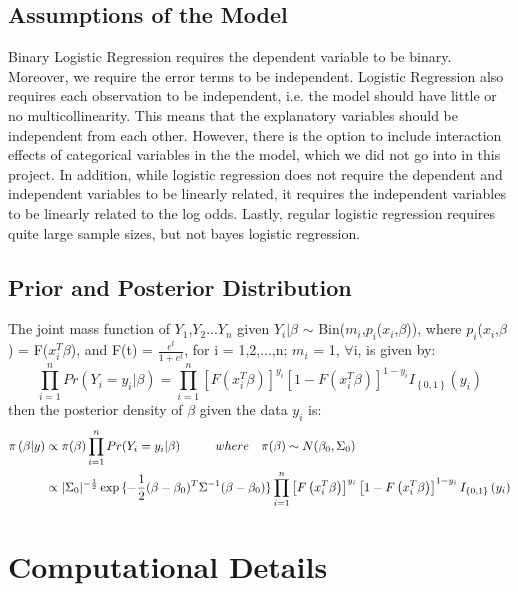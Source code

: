 \documentclass[paper=letterpaper,fontsize=12pt,twoside,american]{scrartcl}
\begin{document}
\subsection{Assumptions of the Model}
Binary Logistic Regression requires the dependent variable to be binary. Moreover, we require the error terms to be independent. Logistic Regression also requires each observation to be independent, i.e. the model should have little or no multicollinearity. This means that the explanatory variables should be independent from each other. However, there is the option to include interaction effects of categorical variables in the the model, which we did not go into in this project. In addition, while logistic regression does not require the dependent and independent variables to be linearly related, it requires the independent variables to be linearly related to the log odds. Lastly, regular logistic regression requires quite large sample sizes, but not bayes logistic regression. 

\subsection{Prior and Posterior Distribution}
The joint mass function of  $Y_{1}$,$Y_{2}$...$Y_{n}$ given $Y_{i}$$|$$\beta$ $\sim$ Bin($m_{i}$,$p_{i}$($x_{i}$,$\beta$)), where $p_{i}$($x_{i}$,$\beta$) = F($x_{i}^{T}$$\beta$), and F(t) = $\frac{e^{t}}{1+e^{t}}$, for i = 1,2,...,n; $m_{i}$ = 1, $\forall$i, is given by:
$$\prod^{n}_{i=1}Pr(Y_{i}=y_{i}|\beta) = \prod^{n}_{i=1}\left[F\left(x_{i}^{T}\beta\right)\right]^{y_{i}}\left[1-F\left(x_{i}^{T}\beta\right)\right]^{1-y_{i}}I_{\left\{0,1\right\}}\left(y_{i}\right)$$
then the posterior density of $\beta$ given the data $y_{i}$ is: 
\begin{align*}
\pi\left(\beta|y\right) & \propto\pi(\beta)\prod^{n}_{i=1}Pr(Y_{i}=y_{i}|\beta)       \hspace{10mm} where \quad\pi(\beta)\sim N(\beta_{0},\Sigma_{0})\\ 
&\propto |\Sigma_{0}|^{-\frac{1}{2}} \exp{\{-\frac{1}{2}(
\beta-\beta_{0})^{T}\Sigma^{-1}(\beta-\beta_{0})}\}\prod^{n}_{i=1}\left[F\left(x_{i}^{T}\beta\right)\right]^{y_{i}}\left[1-F\left(x_{i}^{T}\beta\right)\right]^{1-y_{i}}I_{\left\{0,1\right\}}\left(y_{i}\right)
\end{align*}

\section{Computational Details}
\end{document}
